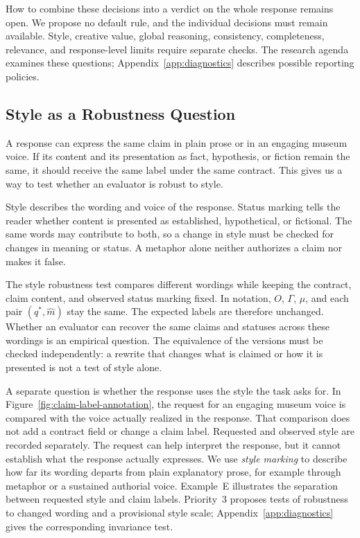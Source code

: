 \documentclass{clv2025}
\begin{document}
How to combine these decisions into a verdict on the whole response remains
open. We propose no default rule, and the individual decisions must remain
available. Style, creative value, global reasoning, consistency, completeness,
relevance, and response-level limits require separate checks. The research
agenda examines these questions; Appendix~\ref{app:diagnostics} describes
possible reporting policies.

\subsection{Style as a Robustness Question}\label{subsec:style}

A response can express the same claim in plain prose or in an engaging
museum voice. If its content and its presentation as fact, hypothesis, or
fiction remain the same, it should receive the same label under the same
contract. This gives us a way to test whether an evaluator is robust to style.

Style describes the wording and voice of the response. Status marking tells
the reader whether content is presented as established, hypothetical, or
fictional. The same words may contribute to both, so a change in style must
be checked for changes in meaning or status. A metaphor alone neither
authorizes a claim nor makes it false.

The style robustness test compares different wordings while keeping the contract, claim
content, and observed status marking fixed. In notation, $O$, $\Gamma$,
$\mu$, and each pair $(q^*,\widehat{m})$ stay the same. The expected labels
are therefore unchanged. Whether an evaluator can recover the same claims
and statuses across these wordings is an empirical question. The equivalence
of the versions must be checked independently: a rewrite that changes what
is claimed or how it is presented is not a test of style alone.

A separate question is whether the response uses the style the task asks
for. In Figure~\ref{fig:claim-label-annotation}, the request for an engaging
museum voice is compared with the voice actually realized in the response.
That comparison does not add a contract field or change a claim label. Requested and observed style are recorded separately. The request can
help interpret the response, but it cannot establish what the response
actually expresses. We use \emph{style marking} to describe how far its
wording departs from plain explanatory prose, for example through metaphor
or a sustained authorial voice. Example~E illustrates the separation between
requested style and claim labels. Priority~3 proposes tests of robustness
to changed wording and a provisional style scale; Appendix~\ref{app:diagnostics}
gives the corresponding invariance test.
\end{document}
